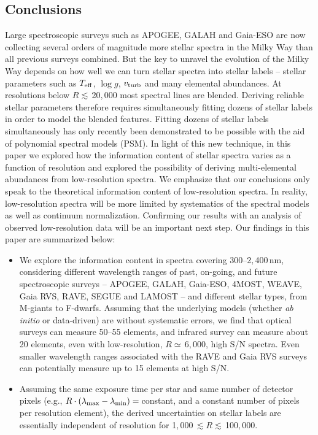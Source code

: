 \documentclass[iop]{emulateapj}
\begin{document}
\begin{CJK*}{UTF8}{gbsn}
\section{Conclusions}
\label{sec:conclusions}

Large spectroscopic surveys such as APOGEE, GALAH and Gaia-ESO are now collecting several orders of magnitude more stellar spectra in the Milky Way than all previous surveys combined. But the key to unravel the evolution of the Milky Way depends on how well we can turn stellar spectra into stellar labels -- stellar parameters such as $T_{\rm eff}$, $\log g$, $v_{\rm turb}$ and many elemental abundances. At resolutions below $R \lesssim \,$20$,$000 most spectral lines are blended. Deriving reliable stellar parameters therefore requires simultaneously fitting dozens of stellar labels in order to model the blended features. Fitting dozens of stellar labels simultaneously has only recently been demonstrated to be possible with the aid of polynomial spectral models (PSM). In light of this new technique, in this paper we explored how the  information content of stellar spectra varies as a function of resolution and explored the possibility of deriving multi-elemental abundances from low-resolution spectra. We emphasize that our conclusions only speak to the theoretical information content of low-resolution spectra. In reality, low-resolution spectra will be more limited by systematics of the spectral models as well as continuum normalization. Confirming our results with an analysis of observed low-resolution data will be an important next step. Our findings in this paper are summarized below:

\begin{itemize}

\item We explore the information content in spectra covering 300--2$,$400$\,$nm, considering different wavelength ranges of past, on-going, and future spectroscopic surveys -- APOGEE, GALAH, Gaia-ESO, 4MOST, WEAVE, Gaia RVS, RAVE, SEGUE and LAMOST -- and different stellar types, from M-giants to F-dwarfs. Assuming that the underlying models (whether {\it ab initio} or data-driven) are without systematic errors, we find that optical surveys can measure 50--55 elements, and infrared survey can measure about 20 elements, even with low-resolution, $R \simeq \,$6$,$000, high S/N spectra. Even smaller wavelength ranges associated with the RAVE and Gaia RVS surveys can potentially measure up to 15 elements at high S/N.

\item Assuming the same exposure time per star and same number of detector pixels (e.g., $R \cdot (\lambda_{\rm max} - \lambda_{\rm min}) = \,$constant, and a constant number of pixels per resolution element), the derived uncertainties on stellar labels are essentially independent of resolution for 1$,$000$\, \lesssim R \lesssim \,$100$,$000. 


\end{itemize}
\end{CJK*}
\end{document}
